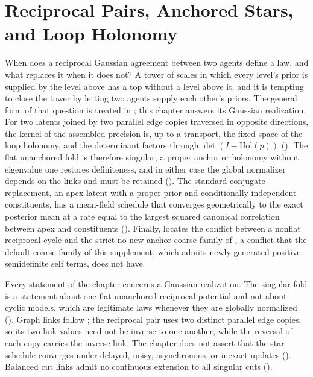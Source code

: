 \chapter{Reciprocal Pairs, Anchored Stars, and Loop Holonomy}
\label{ch:obstructions}

When does a reciprocal Gaussian agreement between two agents define a law, and what
replaces it when it does not? A tower of scales in which every level's prior is
supplied by the level above has a top without a level above it, and it is tempting
to close the tower by letting two agents supply each other's priors. The general
form of that question is treated in ; this chapter
answers its Gaussian realization. For two latents joined by two parallel edge copies
traversed in opposite directions, the kernel of the assembled precision is, up to a
transport, the fixed space of the loop holonomy, and the determinant factors through
\(\det(I-\mathrm{Hol}(p))\)
().
The flat unanchored fold is therefore singular; a proper anchor or holonomy without
eigenvalue one restores definiteness, and in either case the global normalizer
depends on the links and must be retained
(). The standard conjugate replacement, an
apex latent with a proper prior and conditionally independent constituents, has a
mean-field schedule that converges geometrically to the exact posterior mean at a rate
equal to the largest squared canonical correlation between apex and constituents
(). Finally,
 locates the conflict between a nonflat reciprocal
cycle and the strict no-new-anchor coarse family of ,
a conflict that the default coarse family of this supplement, which admits newly
generated positive-semidefinite self terms, does not have.

Every statement of the chapter concerns a Gaussian realization. The singular fold is a
statement about one flat unanchored reciprocal potential and not about cyclic models,
which are legitimate laws whenever they are globally normalized
(). Graph links follow ; the
reciprocal pair uses two distinct parallel edge copies, so its two link values need not
be inverse to one another, while the reversal of each copy carries the inverse link. The
chapter does not assert that the star schedule converges under delayed, noisy,
asynchronous, or inexact updates (). 
Balanced cut links admit no continuous extension to all singular cuts
().


